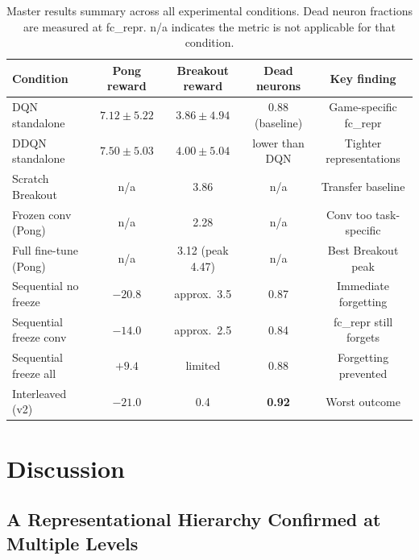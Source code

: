 \documentclass[a4paper]{article}
\begin{document}
\begin{table}[H]
\centering
\caption{Master results summary across all experimental conditions. Dead neuron fractions
are measured at fc\_repr. n/a indicates the metric is not applicable for that condition.}
\label{tab:master}
\small
\begin{tabular}{lcccc}
\toprule
\textbf{Condition} & \textbf{Pong reward} & \textbf{Breakout reward} & \textbf{Dead neurons} & \textbf{Key finding} \\
\midrule
DQN standalone        & $7.12 \pm 5.22$   & $3.86 \pm 4.94$   & 0.88 (baseline) & Game-specific fc\_repr \\
DDQN standalone       & $7.50 \pm 5.03$   & $4.00 \pm 5.04$   & lower than DQN  & Tighter representations \\
\midrule
Scratch Breakout      & n/a               & 3.86              & n/a             & Transfer baseline \\
Frozen conv (Pong)    & n/a               & 2.28              & n/a             & Conv too task-specific \\
Full fine-tune (Pong) & n/a               & 3.12 (peak 4.47)  & n/a             & Best Breakout peak \\
\midrule
Sequential no freeze  & $-20.8$           & approx.\ 3.5      & 0.87            & Immediate forgetting \\
Sequential freeze conv & $-14.0$          & approx.\ 2.5      & 0.84            & fc\_repr still forgets \\
Sequential freeze all & $+9.4$            & limited           & 0.88            & Forgetting prevented \\
\midrule
Interleaved (v2)      & $-21.0$           & 0.4               & \textbf{0.92}   & Worst outcome \\
\bottomrule
\end{tabular}
\end{table}

\section{Discussion}
\label{sec:discussion}

\subsection{A Representational Hierarchy Confirmed at Multiple Levels}
\end{document}
